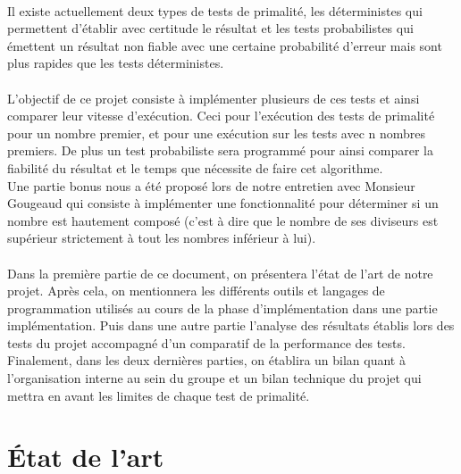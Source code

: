 	\paragraph{}Il existe actuellement deux types de tests de primalité, les déterministes qui permettent d'établir avec certitude le résultat et les tests probabilistes qui émettent un résultat non fiable avec une certaine probabilité d'erreur mais sont plus rapides que les tests déterministes.
	
	\paragraph{}L'objectif de ce projet consiste à implémenter plusieurs de ces tests et ainsi comparer leur vitesse  d'exécution. Ceci pour l'exécution des tests de primalité pour un nombre premier, et pour une exécution sur les tests avec n nombres premiers. De plus un test probabiliste sera programmé pour ainsi comparer la fiabilité du résultat et le temps que nécessite de faire cet algorithme.\\ 
	Une partie bonus nous a été proposé lors de notre entretien avec Monsieur Gougeaud qui consiste à implémenter une fonctionnalité pour déterminer si un nombre est hautement composé (c'est à dire que le nombre de ses diviseurs est supérieur strictement à tout les nombres inférieur à lui). 
	
	\paragraph{}Dans la première partie de ce document, on présentera l'état de l'art de notre projet.
	Après cela, on mentionnera les différents outils et langages de programmation utilisés au cours de la phase d'implémentation dans une partie implémentation. Puis dans une autre partie l'analyse des résultats établis lors des tests du projet accompagné d'un comparatif de la performance des tests.
	Finalement, dans les deux dernières parties, on établira un bilan quant à l'organisation interne au sein du groupe et un bilan technique du projet qui mettra en avant les limites de chaque test de primalité.
	
		
	\section{État de l'art}
